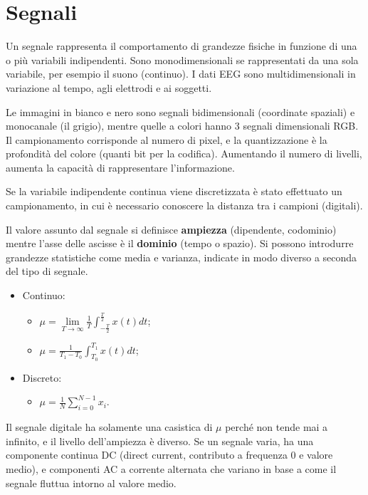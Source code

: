 \section{Segnali}
Un segnale rappresenta il comportamento di grandezze fisiche in funzione di una o più variabili indipendenti. Sono monodimensionali se rappresentati da una sola variabile, per esempio il suono (continuo). I dati EEG sono multidimensionali in variazione al tempo, agli elettrodi e ai soggetti.

Le immagini in bianco e nero sono segnali bidimensionali (coordinate spaziali) e monocanale (il grigio), mentre quelle a colori hanno 3 segnali dimensionali RGB. Il campionamento corrisponde al numero di pixel, e la quantizzazione è la profondità del colore (quanti bit per la codifica). Aumentando il numero di livelli, aumenta la capacità di rappresentare l'informazione.

Se la variabile indipendente continua viene discretizzata è stato effettuato un campionamento, in cui è necessario conoscere la distanza tra i campioni (digitali). 

Il valore assunto dal segnale si definisce \textbf{ampiezza} (dipendente, codominio) mentre l'asse delle ascisse è il \textbf{dominio} (tempo o spazio). Si possono introdurre grandezze statistiche come media e varianza, indicate in modo diverso a seconda del tipo di segnale.

\begin{itemize}
	\item Continuo:
	\begin{itemize}
		\item $\mu = \lim\limits_{T \rightarrow \infty} \frac{1}{T} \int_{-\frac{T}{2}}^{\frac{T}{2}} x(t) dt$;
		\item $\mu = \frac{1}{T_1 - T_0} \int_{T_0}^{T_1} x(t) dt$;
	\end{itemize}
	\item Discreto:
	\begin{itemize}
		\item $\mu = \frac{1}{N} \sum_{i = 0}^{N - 1} x_i$.
	\end{itemize}
\end{itemize}

Il segnale digitale ha solamente una casistica di $\mu$ perché non tende mai a infinito, e il livello dell'ampiezza è diverso. Se un segnale varia, ha una componente continua DC (direct current, contributo a frequenza 0 e valore medio), e componenti AC a corrente alternata che variano in base a come il segnale fluttua intorno al valore medio.

